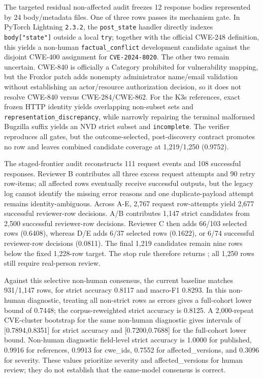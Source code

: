 The targeted residual non-affected audit freezes 12 response bodies represented by 24 body/metadata files. One of three rows passes its mechanism gate. In PyTorch Lightning \texttt{2.3.2}, the \texttt{post\_state} handler directly indexes \texttt{body["state"]} outside a local \texttt{try}; together with the official CWE-248 definition, this yields a non-human \texttt{factual\_conflict} development candidate against the disjoint CWE-400 assignment for \texttt{CVE-2024-8020}. The other two remain uncertain. CWE-840 is officially a Category prohibited for vulnerability mapping, but the Froxlor patch adds nonempty administrator name/email validation without establishing an actor/resource authorization decision, so it does not resolve CWE-840 versus CWE-284/CWE-862. For the K3s references, exact frozen HTTP identity yields overlapping non-subset sets and \texttt{representation\_discrepancy}, while narrowly repairing the terminal malformed Bugzilla suffix yields an NVD strict subset and \texttt{incomplete}. The verifier reproduces all gates, but the outcome-selected, post-discovery contract promotes no row and leaves combined candidate coverage at 1,219/1,250 (0.9752).

The staged-frontier audit reconstructs 111 request events and 108 successful responses. Reviewer B contributes all three excess request attempts and 90 retry row-items; all affected rows eventually receive successful outputs, but the legacy log cannot identify the missing error reasons and one duplicate-payload attempt remains identity-ambiguous. Across A-E, 2,767 request row-attempts yield 2,677 successful reviewer-row decisions. A/B contributes 1,147 strict candidates from 2,500 successful reviewer-row decisions. Reviewer C then adds 66/103 selected rows (0.6408), whereas D/E adds 6/37 selected rows (0.1622), or 6/74 successful reviewer-row decisions (0.0811). The final 1,219 candidates remain nine rows below the fixed 1,228-row target. The stop rule therefore returns ; all 1,250 rows still require real-person review.

Against this selective non-human consensus, the current baseline matches 931/1,147 rows, for strict accuracy 0.8117 and macro-F1 0.8293. In this non-human diagnostic, treating all non-strict rows as errors gives a full-cohort lower bound of 0.7448; the corpus-reweighted strict accuracy is 0.8125. A 2,000-repeat CVE-cluster bootstrap for the same non-human diagnostic gives intervals of [0.7894,0.8351] for strict accuracy and [0.7200,0.7688] for the full-cohort lower bound. Non-human diagnostic field-level strict accuracy is 1.0000 for published, 0.9916 for references, 0.9913 for cwe\_ids, 0.7552 for affected\_versions, and 0.3096 for severity. These values prioritize severity and affected\_versions for human review; they do not establish that the same-model consensus is correct.

